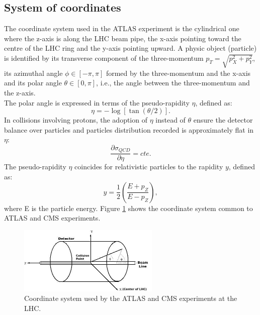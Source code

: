 \subsection{System of coordinates}
\label{chap2:ATLAS:CS}
The coordinate system used in the ATLAS experiment is the cylindrical one where the z-axis is along the LHC beam pipe, the x-axis pointing toward the centre of the LHC ring and the y-axis pointing upward. A physic object (particle) is identified by its transverse component of the three-momentum $p_T = \sqrt{p_X^2 + p_Y^2}$, its azimuthal angle $\phi \in [-\pi,\pi] $ formed by the three-momentum and the x-axis and its polar angle $\theta \in [0,\pi]$, i.e., the angle between the three-momentum and the z-axis. \\
The polar angle is expressed in terms of the pseudo-rapidity $\eta$, defined as:
\begin{equation}
\eta = -\log[\tan(\theta/2)].
\end{equation}
In collisions involving protons, the adoption of $\eta$ instead of $\theta$ ensure the detector balance over particles and particles distribution recorded is approximately flat in $\eta$:
\begin{equation}
\frac{\partial\sigma_{QCD}}{\partial\eta} = cte.
\end{equation}
The pseudo-rapidity $\eta$ coincides for relativistic particles to the rapidity $y$, defined as:
\begin{equation}
y = \frac{1}{2}(\frac{E+p_Z}{E-p_Z}),
\end{equation}
where E is the particle energy.
Figure \ref{fig:chap2:ATLAS:SYS} shows the coordinate system common to ATLAS and CMS experiments.
\begin{figure}[htbp]
    \centering
    \includegraphics[width=0.6\textwidth]{Ch2/Img/ATLAS_Sys.jpeg}
    \caption{Coordinate system used by the ATLAS and CMS experiments at the LHC.}
    \label{fig:chap2:ATLAS:SYS}
\end{figure}

